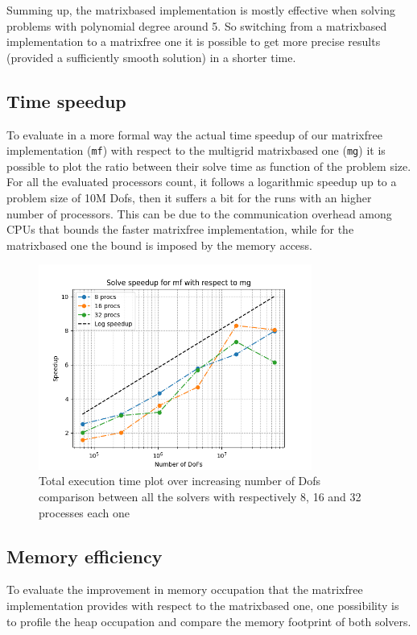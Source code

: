 \documentclass{article}
\begin{document}
Summing up, the matrixbased implementation is mostly effective when solving problems with polynomial degree around 5. So switching from a matrixbased implementation to a matrixfree one it is possible to get more precise results (provided a sufficiently smooth solution) in a shorter time.

\subsection{Time speedup}
To evaluate in a more formal way the actual time speedup of our matrixfree implementation (\verb|mf|) with respect to the multigrid matrixbased one (\verb|mg|) it is possible to plot the ratio between their solve time as function of the problem size. For all the evaluated processors count, it follows a logarithmic speedup up to a problem size of 10M Dofs, then it suffers a bit for the runs with an higher number of processors. This can be due to the communication overhead among CPUs that bounds the faster matrixfree implementation, while for the matrixbased one the bound is imposed by the memory access.

\begin{figure}[h]
    \centering
    \includegraphics[width=0.8\textwidth]{figure/speedup_mf_mg.png}

    \caption{Total execution time plot over increasing number of Dofs comparison between all the solvers with respectively 8, 16 and 32 processes each one}
    \label{fig:speedup}
\end{figure}


\subsection{Memory efficiency}
To evaluate the improvement in memory occupation that the matrixfree implementation provides with respect to the matrixbased one, one possibility is to profile the heap occupation and compare the memory footprint of both solvers.
\end{document}
